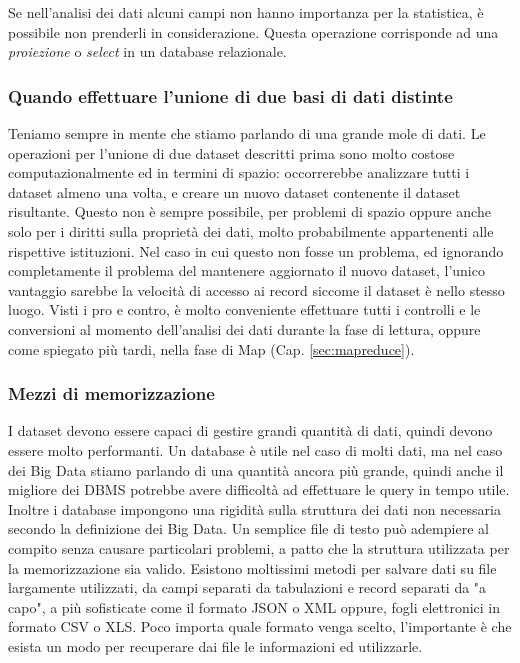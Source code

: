 \begin{itemize}
Se nell'analisi dei dati alcuni campi non hanno importanza per la statistica, è possibile non prenderli in considerazione. Questa operazione corrisponde ad una \emph{proiezione} o \emph{select} in un database relazionale.

\end{itemize}

\subsubsection{Quando effettuare l'unione di due basi di dati distinte}
Teniamo sempre in mente che stiamo parlando di una grande mole di dati. Le operazioni per l'unione di due dataset descritti prima sono molto costose computazionalmente ed in termini di spazio: occorrerebbe analizzare tutti i dataset almeno una volta, e creare un nuovo dataset contenente il dataset risultante. Questo non è sempre possibile, per problemi di spazio oppure anche solo per i diritti sulla proprietà dei dati, molto probabilmente appartenenti alle rispettive istituzioni. Nel caso in cui questo non fosse un problema, ed ignorando completamente il problema del mantenere aggiornato il nuovo dataset, l'unico vantaggio sarebbe la velocità di accesso ai record siccome il dataset è nello stesso luogo. Visti i pro e contro, è molto conveniente effettuare tutti i controlli e le conversioni al momento dell'analisi dei dati durante la fase di lettura, oppure come spiegato più tardi, nella fase di Map (Cap. \ref{sec:mapreduce}).

\subsubsection{Mezzi di memorizzazione}
I dataset devono essere capaci di gestire grandi quantità di dati, quindi devono essere molto performanti. Un database è utile nel caso di molti dati, ma nel caso dei Big Data stiamo parlando di una quantità ancora più grande, quindi anche il migliore dei DBMS potrebbe avere difficoltà ad effettuare le query in tempo utile. Inoltre i database impongono una rigidità sulla struttura dei dati non necessaria secondo la definizione dei Big Data. Un semplice file di testo può adempiere al compito senza causare particolari problemi, a patto che la struttura utilizzata per la memorizzazione sia valido. Esistono moltissimi metodi per salvare dati su file largamente utilizzati, da campi separati da tabulazioni e record separati da "a capo", a più sofisticate come il formato JSON o XML oppure, fogli elettronici in formato CSV o XLS. Poco importa quale formato venga scelto, l'importante è che esista un modo per recuperare dai file le informazioni ed utilizzarle.


